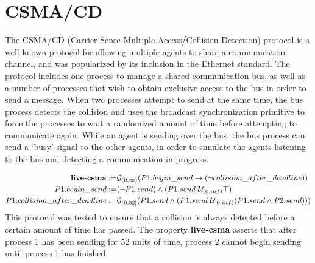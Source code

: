 \documentclass[a4paper,11pt]{report}
\theoremstyle{definition}
\begin{document}
\section{CSMA/CD}\label{evaluation-csma}

The CSMA/CD (Carrier Sense Multiple Access/Collision Detection) protocol is a
well known protocol for allowing multiple agents to share a communication
channel, and was popularized by its inclusion in the Ethernet standard. The
protocol includes one process to manage a shared communication bus, as well as a
number of processes that wish to obtain exclusive access to the bus in order to
send a message. When two processes attempt to send at the same time, the bus
process detects the collision and uses the broadcast synchronization primitive
to force the processes to wait a randomized amount of time before attempting to
communicate again. While an agent is sending over the bus, the bus process can
send a `busy' signal to the other agents, in order to simulate the agents
listening to the bus and detecting a communication in-progress.

\begin{align*}
  \text{\textbf{live-csma}} := & \mathcal{G}_{(0,\infty)}(P1.begin\_send \rightarrow (\neg collision\_after\_deadline)) \\
  P1.begin\_send := & (\neg P1.send) \land (P1.send\ \mathcal{U}_{(0,inf)} \top) \\
  P1.collision\_after\_deadline := & \mathcal{G}_{(0,52]}(P1.send \land (P1.send\ \mathcal{U}_{[0,inf)} (P1.send \land P2.send))) \\
\end{align*}
This protocol was tested to ensure that a collision is always detected before a
certain amount of time has passed.
The property \textbf{live-csma} asserts that after process 1 has been sending
for 52 units of time, process 2 cannot begin sending until process 1 has finished.
\end{document}
